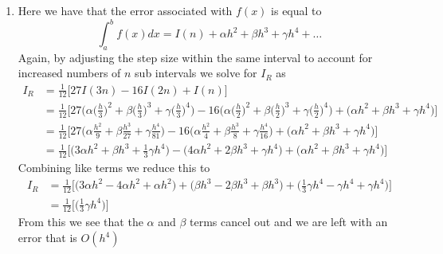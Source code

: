 \documentclass[11pt,a4paper]{article}
\begin{document}
\begin{itemize}
\begin{enumerate} [label={\alph*)}]
\begin{align*}
						&= \frac{1}{21}\Big[\Big(2\alpha h^2 + \frac{1}{2}\beta h^3 + \frac{1}{8}\gamma h^4\Big) - \Big(3\alpha h^2 + \frac{3}{2}\beta h^3 + \frac{3}{4}\gamma h^4 \Big) + \Big(\alpha h^2 + \beta h^3 + \gamma h^4\Big)\Big]
					\end{align*}
					Combining like terms we reduce this to
					\begin{align*}
						I_R &= \frac{1}{21}\Big[\Big(2\alpha h^2 - 3\alpha h^2 + \alpha h^2 \Big) + \Big( \frac{1}{2}\beta h^3 - \frac{3}{2}\beta h^3 + \beta h^3 \Big) + \Big( \frac{1}{8}\gamma h^4 - \frac{3}{4}\gamma h^4 + \gamma h^4 \Big) \Big] \\ 
						&= \frac{1}{21}\Big[\Big( \frac{3}{8} \gamma h^4\Big)\Big]
					\end{align*}
					From this we see that the $\alpha$ and $\beta$ terms cancel out and we are left with an error that is $O(h^4)$
					
					\item Here we have that the error associated with $f(x)$ is equal to $$\int_a^b f(x)dx = I(n) + \alpha h^2 + \beta h^3 + \gamma h^4 + \dots$$
					Again, by adjusting the step size within the same interval to account for increased numbers of $n$ sub intervals we solve for $I_R$ as
					\begin{align*}
						I_R &= \frac{1}{12}\Big[27I(3n) - 16I(2n) + I(n)\Big] \\
						&= \frac{1}{12}\Big[27\Big(\alpha \big( \frac{h}{3}\big)^2 + \beta\big(\frac{h}{3}\big)^3 + \gamma\big(\frac{h}{3}\big)^4\Big) - 16\Big(\alpha\big(\frac{h}{2}\big)^2 + \beta\big(\frac{h}{2}\big)^3 + \gamma\big(\frac{h}{2}\big)^4\Big) + \Big(\alpha h^2 + \beta h^3 + \gamma h^4\Big)\Big] \\
						&= \frac{1}{12}\Big[27\Big(\alpha \frac{h^2}{9} + \beta\frac{h^3}{27} + \gamma\frac{h^4}{81}\Big) - 16\Big(\alpha\frac{h^2}{4} + \beta\frac{h^3}{8} + \gamma\frac{h^4}{16}\Big) + \Big(\alpha h^2 + \beta h^3 + \gamma h^4\Big)\Big] \\
						&= \frac{1}{12}\Big[\Big(3\alpha h^2 + \beta h^3 + \frac{1}{3}\gamma h^4\Big) - \Big(4\alpha h^2 + 2\beta h^3 + \gamma h^4 \Big) + \Big(\alpha h^2 + \beta h^3 + \gamma h^4\Big)\Big]
					\end{align*}
					Combining like terms we reduce this to
					\begin{align*}
						I_R &= \frac{1}{12}\Big[\Big(3\alpha h^2 - 4\alpha h^2 + \alpha h^2 \Big) + \Big(\beta h^3 - 2\beta h^3 + \beta h^3 \Big) + \Big( \frac{1}{3}\gamma h^4 - \gamma h^4 + \gamma h^4 \Big) \Big] \\ 
						&= \frac{1}{12}\Big[\Big( \frac{1}{3} \gamma h^4\Big)\Big]
					\end{align*}
					From this we see that the $\alpha$ and $\beta$ terms cancel out and we are left with an error that is $O(h^4)$
					

\end{enumerate}
\end{itemize}
\end{document}
